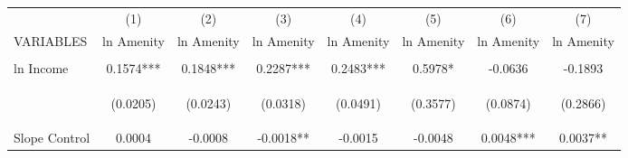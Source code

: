 
\begin{tabular}{lccccccc} \hline
 & (1) & (2) & (3) & (4) & (5) & (6) & (7) \\
VARIABLES & ln Amenity & ln Amenity & ln Amenity & ln Amenity & ln Amenity & ln Amenity & ln Amenity \\ \hline
\vspace{4pt} & \begin{footnotesize}\end{footnotesize} & \begin{footnotesize}\end{footnotesize} & \begin{footnotesize}\end{footnotesize} & \begin{footnotesize}\end{footnotesize} & \begin{footnotesize}\end{footnotesize} & \begin{footnotesize}\end{footnotesize} & \begin{footnotesize}\end{footnotesize} \\
ln Income & 0.1574*** & 0.1848*** & 0.2287*** & 0.2483*** & 0.5978* & -0.0636 & -0.1893 \\
\vspace{4pt} & \begin{footnotesize}(0.0205)\end{footnotesize} & \begin{footnotesize}(0.0243)\end{footnotesize} & \begin{footnotesize}(0.0318)\end{footnotesize} & \begin{footnotesize}(0.0491)\end{footnotesize} & \begin{footnotesize}(0.3577)\end{footnotesize} & \begin{footnotesize}(0.0874)\end{footnotesize} & \begin{footnotesize}(0.2866)\end{footnotesize} \\
Slope Control & 0.0004 & -0.0008 & -0.0018** & -0.0015 & -0.0048 & 0.0048*** & 0.0037** \\

\end{tabular}
